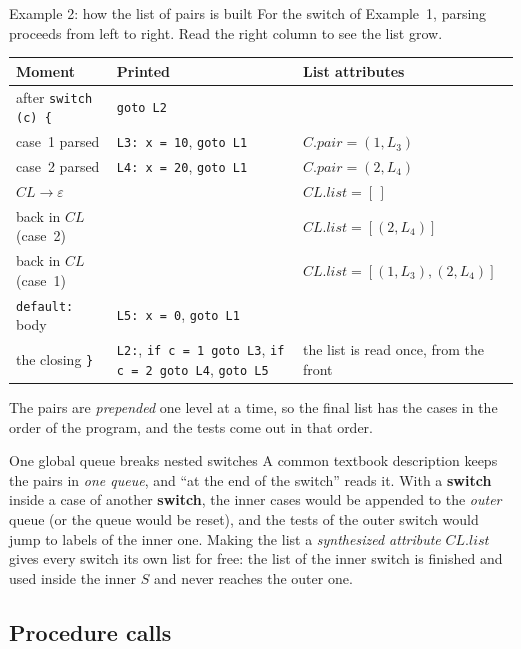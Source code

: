 \documentclass[11pt,a4paper]{article}
\newcommand{\at}[2]{\ensuremath{#1.\mathit{#2}}}
\begin{document}
\begin{examplebox}{Example 2: how the list of pairs is built}
For the switch of Example~1, parsing proceeds from left to right. Read the right column to see the list grow.
\begin{center}
\small
\begin{tabular}{@{}p{3.4cm} p{5.6cm} p{4.4cm}@{}}
\toprule
\textbf{Moment} & \textbf{Printed} & \textbf{List attributes} \\ \midrule
after \texttt{switch (c) \{} & \texttt{goto L2} & \\
case~1 parsed & \texttt{L3: x = 10}, \texttt{goto L1} & $C.pair=(1,L_3)$ \\
case~2 parsed & \texttt{L4: x = 20}, \texttt{goto L1} & $C.pair=(2,L_4)$ \\
$\mathit{CL}\to\varepsilon$ & & $CL.list=[\,]$ \\
back in $\mathit{CL}$ (case~2) & & $CL.list=[(2,L_4)]$ \\
back in $\mathit{CL}$ (case~1) & & $CL.list=[(1,L_3),(2,L_4)]$ \\
\texttt{default:} body & \texttt{L5: x = 0}, \texttt{goto L1} & \\
the closing \texttt{\}} & \texttt{L2:}, \texttt{if c = 1 goto L3}, \texttt{if c = 2 goto L4}, \texttt{goto L5} & the list is read once, from the front \\ \bottomrule
\end{tabular}
\end{center}
The pairs are \emph{prepended} one level at a time, so the final list has the cases in the order of the program, and the tests come out in that order.
\end{examplebox}

\begin{pitfallbox}{One global queue breaks nested switches}
A common textbook description keeps the pairs in \emph{one queue}, and ``at the end of the switch'' reads it. With a \textbf{switch} inside a case of another \textbf{switch}, the inner cases would be appended to the \emph{outer} queue (or the queue would be reset), and the tests of the outer switch would jump to labels of the inner one. Making the list a \emph{synthesized attribute} \at{CL}{list} gives every switch its own list for free: the list of the inner switch is finished and used inside the inner $S$ and never reaches the outer one.
\end{pitfallbox}

\subsection{Procedure calls}
\label{sec:proccall}
\end{document}
